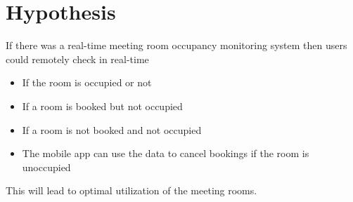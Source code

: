 \chapter{Hypothesis}

If there was a real-time meeting room occupancy monitoring system then users could remotely check in real-time 
\begin{itemize}
\item If the room is occupied or not 
\item If a room is booked but not occupied
\item If a room is not booked and not occupied
\item The mobile app can use the data to cancel bookings if the room is unoccupied
\end{itemize}

This will lead to optimal utilization of the meeting rooms.

